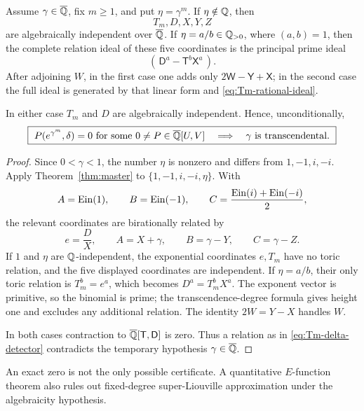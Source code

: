 \begin{theorem}
\label{thm:Tm-exact-ideals}
Assume \(\gamma\in\overline{\mathbb Q}\), fix \(m\ge1\), and put
\(\eta=\gamma^m\).  If \(\eta\notin\mathbb Q\), then
\[
 T_m,D,X,Y,Z
\]
are algebraically independent over \(\overline{\mathbb Q}\).  If
\(\eta=a/b\in\mathbb Q_{>0}\), where \((a,b)=1\), then the complete relation
ideal of these five coordinates is the principal prime ideal
\begin{equation}\label{eq:Tm-rational-ideal}
 (\,\mathsf D^a-\mathsf T^b\mathsf X^a\,).
\end{equation}
After adjoining \(W\), in the first case one adds only
\(2\mathsf W-\mathsf Y+\mathsf X\); in the second case the full ideal is
generated by that linear form and \eqref{eq:Tm-rational-ideal}.

In either case \(T_m\) and \(D\) are algebraically independent.  Hence,
unconditionally,
\begin{equation}\label{eq:Tm-delta-detector}
 \boxed{\ P(e^{\gamma^m},\delta)=0\text{ for some }
 0\ne P\in\overline{\mathbb Q}[U,V]\quad\Longrightarrow\quad
 \gamma\text{ is transcendental}.\ }
\end{equation}
\end{theorem}

\begin{proof}
Since \(0<\gamma<1\), the number \(\eta\) is nonzero and differs from
\(1,-1,i,-i\).  Apply Theorem~\ref{thm:master} to
\(\{1,-1,i,-i,\eta\}\).  With
\[
 A=\operatorname{Ein}(1),\qquad B=\operatorname{Ein}(-1),\qquad
 C=\frac{\operatorname{Ein}(i)+\operatorname{Ein}(-i)}2,
\]
the relevant coordinates are birationally related by
\[
 e=\frac D X,\qquad A=X+\gamma,\qquad
 B=\gamma-Y,\qquad C=\gamma-Z.
\]
If \(1\) and \(\eta\) are \(\mathbb Q\)-independent, the exponential coordinates
\(e,T_m\) have no toric relation, and the five displayed coordinates are
independent.  If \(\eta=a/b\), their only toric relation is
\(T_m^b=e^a\), which becomes
\(D^a=T_m^bX^a\).  The exponent vector is primitive, so the binomial is
prime; the transcendence-degree formula gives height one and excludes any
additional relation.  The identity \(2W=Y-X\) handles \(W\).

In both cases contraction to \(\overline{\mathbb Q}[\mathsf T,\mathsf D]\) is zero.  Thus
a relation as in \eqref{eq:Tm-delta-detector} contradicts the temporary
hypothesis \(\gamma\in\overline{\mathbb Q}\).
\end{proof}

An exact zero is not the only possible certificate.  A quantitative
\(E\)-function theorem also rules out fixed-degree super-Liouville
approximation under the algebraicity hypothesis.

